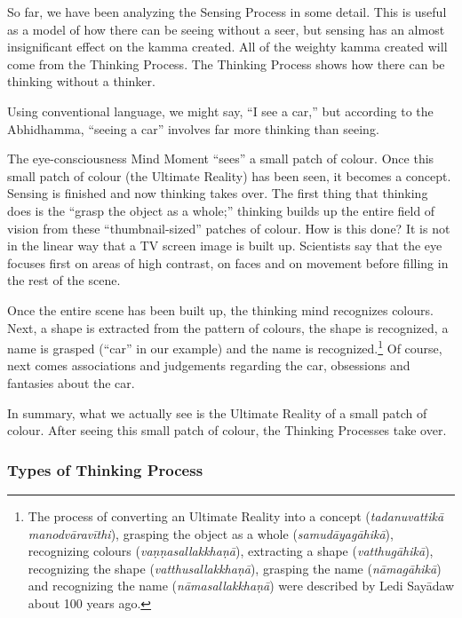 So far, we have been analyzing the Sensing Process in some detail. This is useful as a model of how there can be seeing without a seer, but sensing has an almost insignificant effect on the kamma created. All of the weighty kamma created will come from the Thinking Process. The Thinking Process shows how there can be thinking without a thinker.

Using conventional language, we might say, “I see a car,” but according to the Abhidhamma, “seeing a car” involves far more thinking than seeing.

The eye-consciousness Mind Moment “sees” a small patch of colour. Once this small patch of colour (the Ultimate Reality) has been seen, it becomes a concept. Sensing is finished and now thinking takes over. The first thing that thinking does is the “grasp the object as a whole;” thinking builds up the entire field of vision from these “thumbnail-sized” patches of colour. How is this done? It is not in the linear way that a TV screen image is built up. Scientists say that the eye focuses first on areas of high contrast, on faces and on movement before filling in the rest of the scene.

Once the entire scene has been built up, the thinking mind recognizes colours. Next, a shape is extracted from the pattern of colours, the shape is recognized, a name is grasped (“car” in our example) and the name is recognized.\footnote{The process of converting an Ultimate Reality into a concept (\textit{tadanuvattikā manodvāravīthi}), grasping the object as a whole (\textit{samudāyagāhikā}), recognizing colours (\textit{vaṇṇasallakkhaṇā}), extracting a shape (\textit{vatthugāhikā}), recognizing the shape (\textit{vatthusallakkhaṇā}), grasping the name (\textit{nāmagāhikā}) and recognizing the name (\textit{nāmasallakkhaṇā}) were described by Ledi Sayādaw about 100 years ago.} Of course, next comes associations and judgements regarding the car, obsessions and fantasies about the car.

In summary, what we actually see is the Ultimate Reality of a small patch of colour. After seeing this small patch of colour, the Thinking Processes take over.

\subsubsection*{Types of Thinking Process}

